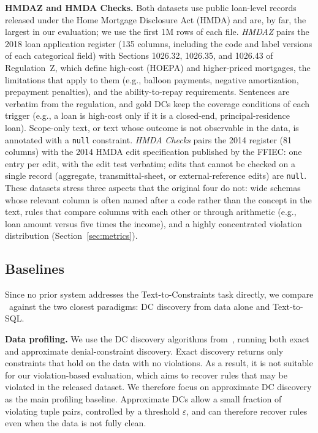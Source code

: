 \smallskip\noindent\textbf{HMDAZ and HMDA Checks.}
Both datasets use public loan-level records released under the Home Mortgage
Disclosure Act (HMDA) and are, by far, the largest in our evaluation; we use the
first 1M rows of each file. \emph{HMDAZ} pairs the 2018 loan application
register (135 columns, including the code and label versions of each
categorical field) with Sections 1026.32, 1026.35, and 1026.43 of Regulation~Z,
which define high-cost (HOEPA) and higher-priced mortgages, the limitations
that apply to them (e.g., balloon payments, negative amortization, prepayment
penalties), and the ability-to-repay requirements. Sentences are verbatim from
the regulation, and gold DCs keep the coverage conditions of each trigger (e.g.,
a loan is high-cost only if it is a closed-end, principal-residence loan).
Scope-only text, or text whose outcome is not observable in the data, is
annotated with a \texttt{null} constraint. \emph{HMDA Checks} pairs the 2014
register (81 columns) with the 2014 HMDA edit specification published by the
FFIEC: one entry per edit, with the edit test verbatim; edits that cannot be
checked on a single record (aggregate, transmittal-sheet, or external-reference
edits) are \texttt{null}. These datasets stress three aspects that the original
four do not: wide schemas whose relevant column is often named after a code
rather than the concept in the text, rules that compare columns with each other
or through arithmetic (e.g., loan amount versus five times the income), and a
highly concentrated violation distribution (Section~\ref{sec:metrics}).

\subsection{Baselines}
\label{sec:baselines}

Since no prior system addresses the Text-to-Constraints task directly, we compare \system\ against the two closest paradigms: DC discovery from data alone and Text-to-SQL.

\smallskip\noindent\textbf{Data profiling.}
We use the DC discovery algorithms from~\cite{Pena2022FastDC}, running both exact and approximate denial-constraint discovery. Exact discovery returns only constraints that hold on the data with no violations. As a result, it is not suitable for our violation-based evaluation, which aims to recover rules that may be violated in the released dataset. We therefore focus on approximate DC discovery as the main profiling baseline. Approximate DCs allow a small fraction of violating tuple pairs, controlled by a threshold $\varepsilon$, and can therefore recover rules even when the data is not fully clean.

